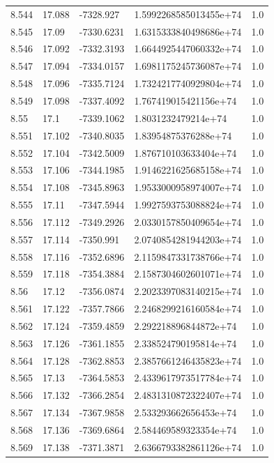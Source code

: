 \begin{tabular}{lllll}
8.544 & 17.088 & -7328.927 & 1.5992268585013455e+74 & 1.0 \\
8.545 & 17.09 & -7330.6231 & 1.6315333840498686e+74 & 1.0 \\
8.546 & 17.092 & -7332.3193 & 1.6644925447060332e+74 & 1.0 \\
8.547 & 17.094 & -7334.0157 & 1.6981175245736087e+74 & 1.0 \\
8.548 & 17.096 & -7335.7124 & 1.7324217740929804e+74 & 1.0 \\
8.549 & 17.098 & -7337.4092 & 1.767419015421156e+74 & 1.0 \\
8.55 & 17.1 & -7339.1062 & 1.8031232479214e+74 & 1.0 \\
8.551 & 17.102 & -7340.8035 & 1.83954875376288e+74 & 1.0 \\
8.552 & 17.104 & -7342.5009 & 1.876710103633404e+74 & 1.0 \\
8.553 & 17.106 & -7344.1985 & 1.9146221625685158e+74 & 1.0 \\
8.554 & 17.108 & -7345.8963 & 1.9533000958974007e+74 & 1.0 \\
8.555 & 17.11 & -7347.5944 & 1.9927593753088824e+74 & 1.0 \\
8.556 & 17.112 & -7349.2926 & 2.0330157850409654e+74 & 1.0 \\
8.557 & 17.114 & -7350.991 & 2.0740854281944203e+74 & 1.0 \\
8.558 & 17.116 & -7352.6896 & 2.1159847331738766e+74 & 1.0 \\
8.559 & 17.118 & -7354.3884 & 2.1587304602601071e+74 & 1.0 \\
8.56 & 17.12 & -7356.0874 & 2.2023397083140215e+74 & 1.0 \\
8.561 & 17.122 & -7357.7866 & 2.2468299216160584e+74 & 1.0 \\
8.562 & 17.124 & -7359.4859 & 2.292218896844872e+74 & 1.0 \\
8.563 & 17.126 & -7361.1855 & 2.338524790195814e+74 & 1.0 \\
8.564 & 17.128 & -7362.8853 & 2.3857661246435823e+74 & 1.0 \\
8.565 & 17.13 & -7364.5853 & 2.4339617973517784e+74 & 1.0 \\
8.566 & 17.132 & -7366.2854 & 2.4831310872322407e+74 & 1.0 \\
8.567 & 17.134 & -7367.9858 & 2.533293662656453e+74 & 1.0 \\
8.568 & 17.136 & -7369.6864 & 2.584469589323354e+74 & 1.0 \\
8.569 & 17.138 & -7371.3871 & 2.6366793382861126e+74 & 1.0 \\

\end{tabular}
